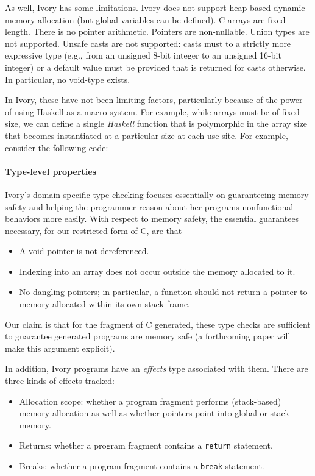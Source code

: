 As well, Ivory has some limitations.  Ivory does not support heap-based dynamic
memory allocation (but global variables can be defined).  C arrays are
fixed-length.  There is no pointer arithmetic.  Pointers are non-nullable.
Union types are not supported.  Unsafe casts are not supported: casts must to a
strictly more expressive type (e.g., from an unsigned 8-bit integer to an
unsigned 16-bit integer) or a default value must be provided that is returned
for casts otherwise.  In particular, no void-type exists.

In Ivory, these have not been limiting factors, particularly because of the
power of using Haskell as a macro system.  For example, while arrays must be of
fixed size, we can define a single \emph{Haskell} function that is polymorphic
in the array size that becomes instantiated at a particular size at each use
site.  For example, consider the following code:


\paragraph{Type-level properties}
Ivory's domain-specific type checking focuses essentially on guaranteeing memory
safety and helping the programmer reason about her programs nonfunctional
behaviors more easily.  With respect to memory safety, the essential
guarantees necessary, for our restricted form of C, are that
\begin{itemize}
  \item A void pointer is not dereferenced.
  \item Indexing into an array does not occur outside the memory allocated to
    it.
  \item No dangling pointers; in particular, a function should not return a
    pointer to memory allocated within its own stack frame.
\end{itemize}

\noindent
Our claim is that for the fragment of C generated, these type checks are
sufficient to guarantee generated programs are memory safe (a forthcoming paper
will make this argument explicit).

In addition, Ivory programs have an \emph{effects} type associated with them.
There are three kinds of effects tracked:
\begin{itemize}
  \item Allocation scope: whether a program fragment performs (stack-based)
    memory allocation as well as whether pointers point into global or stack memory.
  \item Returns: whether a program fragment contains a \texttt{return} statement.
  \item Breaks: whether a program fragment contains a \texttt{break} statement.
\end{itemize}

